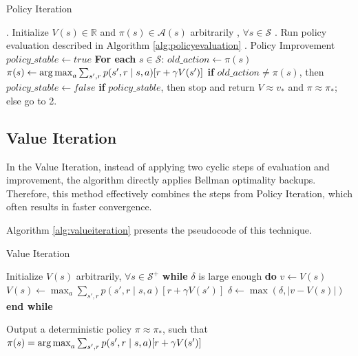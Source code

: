 \begin{algorithm}
	\caption{Policy Iteration}
	\begin{algorithmic}
		. Initialize $V(s) \in \mathbb{R}$ and $\pi(s) \in \mathcal{A}(s)$ arbitrarily , $\forall s \in \mathcal{S}$ 
		. Run policy evaluation described in Algorithm \ref{alg:policyevaluation}
		. Policy Improvement
		\STATE \hspace{5mm} $policy \_ stable \leftarrow true$
		\STATE \hspace{5mm}\textbf{ For each} $s \in \mathcal{S}$:
		\STATE \hspace{10mm} $old\_action \leftarrow \pi(s)$
		\STATE \hspace{10mm} $\pi(s) \leftarrow \operatorname*{arg\,max}_{a} \sum_{s',r} p(s', r \mid s,a)[r + \gamma V(s')]$
		\STATE \hspace{10mm} \textbf{if} $old\_action \neq \pi(s)$, then $policy \_ stable \leftarrow false$
		\STATE \hspace{5mm} \textbf{if} $policy \_ stable$, then stop and return $V \approx v_{*}$ and $\pi \approx \pi_{*}$; else go to 2.
	\end{algorithmic}
	\label{alg:policyiteration}	
\end{algorithm}

\subsection{Value Iteration}

In the Value Iteration, instead of applying two cyclic steps of evaluation and improvement, the algorithm directly applies Bellman optimality backups. Therefore, this method effectively combines the steps from Policy Iteration, which often results in faster convergence.

Algorithm \ref{alg:valueiteration} presents the pseudocode of this technique.


\begin{algorithm}
	\caption{Value Iteration}
	\begin{algorithmic}

		\STATE Initialize $V(s)$ arbitrarily, $\forall s \in \mathcal{S}^{+}$ 
		\STATE \textbf{while} $\delta$ is large enough \textbf{do}
		\STATE \hspace{5mm} $v \leftarrow V(s)$
		\STATE \hspace{5mm} $V(s) \leftarrow \max_{a} \sum_{s',r} p(s',r \mid s,a)[r + \gamma V(s')]$
		\STATE \hspace{5mm} $\delta \leftarrow \max(\delta, \lvert v - V(s) \rvert)$
		\STATE \textbf{end while} 
		
		\STATE Output a deterministic policy $\pi \approx \pi_{*}$, such that
		\STATE \hspace{5mm} $\pi(s) = \operatorname*{arg\,max}_{a} \sum_{s', r}p(s',r \mid s,a)[r + \gamma V(s')]$	
	\end{algorithmic}
	\label{alg:valueiteration}	
\end{algorithm}

